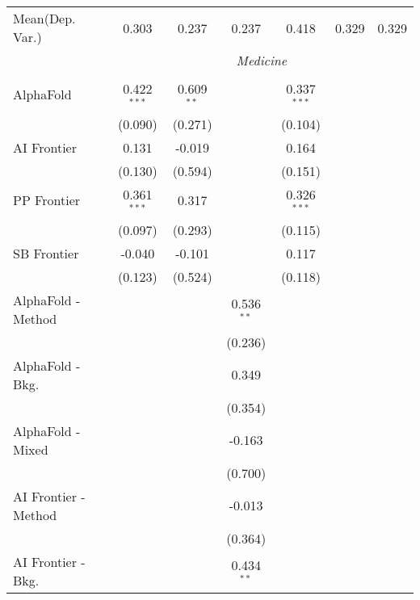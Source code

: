 \begin{tabular}{lcccccc}
Mean(Dep. Var.) & 0.303 & 0.237 & 0.237 & 0.418 & 0.329 & 0.329 \\
 & \multicolumn{6}{c}{\textit{Medicine}} \\ \\
   AlphaFold            & 0.422$^{***}$ & 0.609$^{**}$ &               & 0.337$^{***}$ &        &   \\   
                        & (0.090)       & (0.271)      &               & (0.104)       &        &   \\   
   AI Frontier          & 0.131         & -0.019       &               & 0.164         &        &   \\   
                        & (0.130)       & (0.594)      &               & (0.151)       &        &   \\   
   PP Frontier          & 0.361$^{***}$ & 0.317        &               & 0.326$^{***}$ &        &   \\   
                        & (0.097)       & (0.293)      &               & (0.115)       &        &   \\   
   SB Frontier          & -0.040        & -0.101       &               & 0.117         &        &   \\   
                        & (0.123)       & (0.524)      &               & (0.118)       &        &   \\   
   AlphaFold - Method   &               &              & 0.536$^{**}$  &               &        &   \\   
                        &               &              & (0.236)       &               &        &   \\   
   AlphaFold - Bkg.     &               &              & 0.349         &               &        &   \\   
                        &               &              & (0.354)       &               &        &   \\   
   AlphaFold - Mixed    &               &              & -0.163        &               &        &   \\   
                        &               &              & (0.700)       &               &        &   \\   
   AI Frontier - Method &               &              & -0.013        &               &        &   \\   
                        &               &              & (0.364)       &               &        &   \\   
   AI Frontier - Bkg.   &               &              & 0.434$^{**}$  &               &        &   \\   

\end{tabular}
